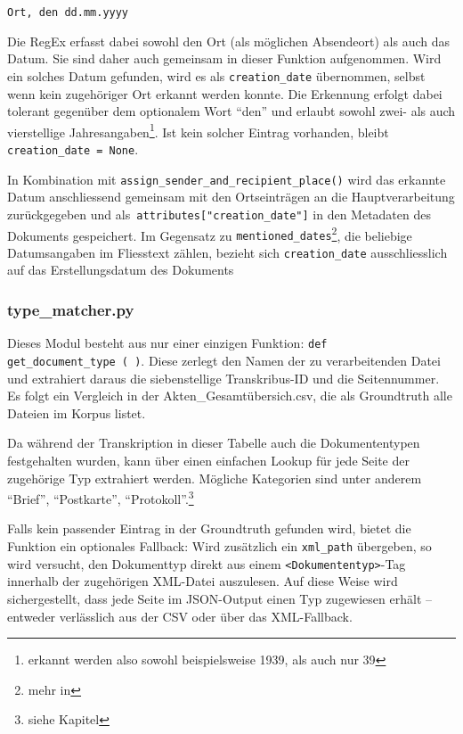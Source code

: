 \documentclass[12pt, a4paper, ngerman, bidi=default]{article}
\newcommand{\code}[1]{\colorbox{VeryLightGray}{\texttt{#1}}} %
\begin{document}
\begin{center}
\texttt{Ort, den dd.mm.yyyy}
\end{center}

\noindent Die RegEx erfasst dabei sowohl den Ort (als möglichen Absendeort) als auch das Datum. Sie sind daher auch gemeinsam in dieser Funktion aufgenommen. Wird ein solches Datum gefunden, wird es als \code{creation\_date} übernommen, selbst wenn kein zugehöriger Ort erkannt werden konnte. Die Erkennung erfolgt dabei tolerant gegenüber dem optionalem Wort \enquote{den} und erlaubt sowohl zwei- als auch vierstellige Jahresangaben\footnote{erkannt werden also sowohl beispielsweise 1939, als auch nur 39}. Ist kein solcher Eintrag vorhanden, bleibt \code{creation\_date = None}.

In Kombination mit \code{assign\_sender\_and\_recipient\_place()} wird das erkannte Datum anschliessend gemeinsam mit den Ortseinträgen an die Hauptverarbeitung zurückgegeben und als\code{ attributes["creation\_date"]} in den Metadaten des Dokuments gespeichert. Im Gegensatz zu \code{mentioned\_dates}\footnote{mehr in }, die beliebige Datumsangaben im Fliesstext zählen, bezieht sich \code{creation\_date} ausschliesslich auf das Erstellungsdatum des Dokuments


\subsubsection{type\_matcher.py}\label{subsection:type_matcher}
Dieses Modul besteht aus nur einer einzigen Funktion: \code{def get\_document\_type~(~)}. Diese zerlegt den Namen der zu verarbeitenden Datei und extrahiert daraus die siebenstellige Transkribus-ID und die Seitennummer. Es folgt ein Vergleich in der Akten\_Gesamtübersich.csv, die als Groundtruth alle Dateien im Korpus listet.

Da während der Transkription in dieser Tabelle auch die Dokumententypen festgehalten wurden, kann über einen einfachen Lookup für jede Seite der zugehörige Typ extrahiert werden. Mögliche Kategorien sind unter anderem \enquote{Brief}, \enquote{Postkarte}, \enquote{Protokoll}.\footnote{siehe Kapitel } 

Falls kein passender Eintrag in der Groundtruth gefunden wird, bietet die Funktion ein optionales Fallback: Wird zusätzlich ein \code{xml\_path} übergeben, so wird versucht, den Dokumenttyp direkt aus einem \code{<Dokumententyp>}-Tag innerhalb der zugehörigen XML-Datei auszulesen. Auf diese Weise wird sichergestellt, dass jede Seite im JSON-Output einen Typ zugewiesen erhält – entweder verlässlich aus der CSV oder über das XML-Fallback.
\end{document}

